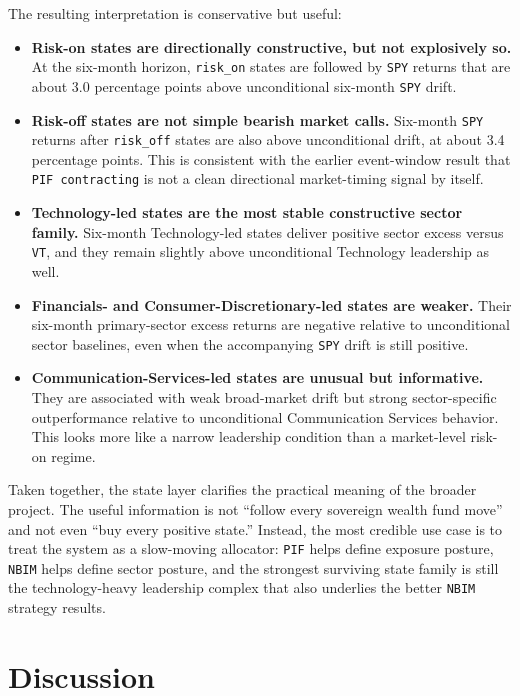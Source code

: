 \documentclass[conference]{IEEEtran}
\begin{document}
The resulting interpretation is conservative but useful:
\begin{itemize}[leftmargin=1.4em]
    \item \textbf{Risk-on states are directionally constructive, but not explosively so.} At the six-month horizon, \texttt{risk\_on} states are followed by \texttt{SPY} returns that are about 3.0 percentage points above unconditional six-month \texttt{SPY} drift.
    \item \textbf{Risk-off states are not simple bearish market calls.} Six-month \texttt{SPY} returns after \texttt{risk\_off} states are also above unconditional drift, at about 3.4 percentage points. This is consistent with the earlier event-window result that \texttt{PIF contracting} is not a clean directional market-timing signal by itself.
    \item \textbf{Technology-led states are the most stable constructive sector family.} Six-month Technology-led states deliver positive sector excess versus \texttt{VT}, and they remain slightly above unconditional Technology leadership as well.
    \item \textbf{Financials- and Consumer-Discretionary-led states are weaker.} Their six-month primary-sector excess returns are negative relative to unconditional sector baselines, even when the accompanying \texttt{SPY} drift is still positive.
    \item \textbf{Communication-Services-led states are unusual but informative.} They are associated with weak broad-market drift but strong sector-specific outperformance relative to unconditional Communication Services behavior. This looks more like a narrow leadership condition than a market-level risk-on regime.
\end{itemize}

Taken together, the state layer clarifies the practical meaning of the broader project. The useful information is not ``follow every sovereign wealth fund move'' and not even ``buy every positive state.'' Instead, the most credible use case is to treat the system as a slow-moving allocator: \texttt{PIF} helps define exposure posture, \texttt{NBIM} helps define sector posture, and the strongest surviving state family is still the technology-heavy leadership complex that also underlies the better \texttt{NBIM} strategy results.

\section{Discussion}
\end{document}

